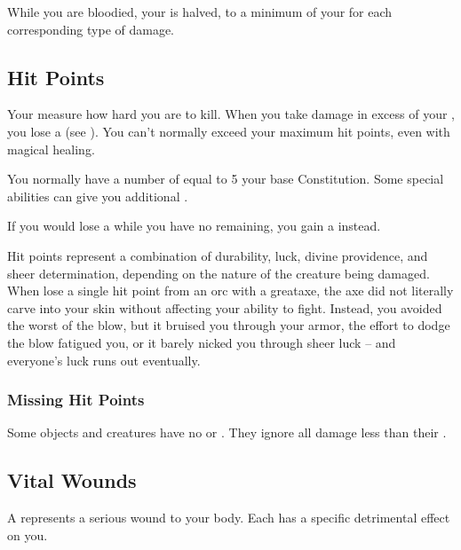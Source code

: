         While you are bloodied, your  is halved, to a minimum of your  for each corresponding type of damage.

    \subsection{Hit Points}\label{Hit Points}
        Your  measure how hard you are to kill.
        When you take damage in excess of your , you lose a  (see ).
        You can't normally exceed your maximum hit points, even with magical healing.

        You normally have a number of  equal to 5 \add your base Constitution.
        Some special abilities can give you additional .

        If you would lose a  while you have no  remaining, you gain a  instead.

         Hit points represent a combination of durability, luck, divine providence, and sheer determination, depending on the nature of the creature being damaged.
        When lose a single hit point from an orc with a greataxe, the axe did not literally carve into your skin without affecting your ability to fight.
        Instead, you avoided the worst of the blow, but it bruised you through your armor, the effort to dodge the blow fatigued you, or it barely nicked you through sheer luck -- and everyone's luck runs out eventually.

        \subsubsection{Missing Hit Points}\label{Missing Hit Points}
            Some objects and creatures have no  or .
            They ignore all damage less than their .

    \subsection{Vital Wounds}\label{Vital Wounds}
        A  represents a serious wound to your body.
        Each  has a specific detrimental effect on you.

